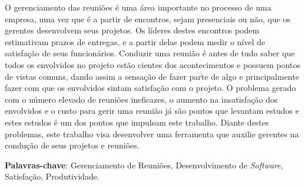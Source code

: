 \begin{resumo}

O gerenciamento das reuniões é uma área importante no processo de uma empresa, uma vez que é a partir de encontros, sejam presenciais ou não, que os gerentes  desenvolvem seus projetos. Os líderes destes encontros podem estimativam prazos de entregas, e a partir delas podem medir o nível de satisfação de seus funcionários. Conduzir uma reunião é antes de tudo saber que todos os envolvidos no projeto estão cientes dos acontecimentos e possuem pontos de vistas comuns, dando assim a sensação de fazer parte de algo e principalmente fazer com que os envolvidos sintam satisfação com o projeto. O problema gerado com o número elevado de reuniões ineficazes, o aumento na insatisfação dos envolvidos e o custo para gerir uma reunião já são pontos que levantam estudos e estes estudos é um dos pontos que impulsam este trabalho. Diante destes problemas, este trabalho visa desenvolver uma ferramenta que auxilie gerentes na condução de seus projetos e reuniões. 

 \vspace{\onelineskip}

 \noindent
 \textbf{Palavras-chave}: Gerenciamento de Reuniões, Desenvolvimento de \textit{Software}, Satisfação, Produtividade.
\end{resumo}
